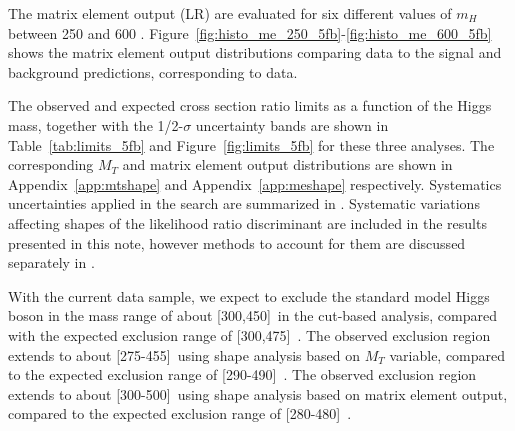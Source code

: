 The matrix element output (LR) are evaluated for six different values of $m_H$ between 250 and 600 \GeVcc.
Figure~\ref{fig:histo_me_250_5fb}-\ref{fig:histo_me_600_5fb} shows the matrix element output distributions 
comparing data to the signal and background predictions, corresponding to \intlumi data.

The observed and expected cross section ratio limits as a function of the Higgs mass, together with the 1/2-$\sigma$ uncertainty bands 
are shown in Table~\ref{tab:limits_5fb} and Figure~\ref{fig:limits_5fb} for these three analyses. 
The corresponding $M_T$ and matrix element output distributions are shown in Appendix~\ref{app:mtshape} and Appendix~\ref{app:meshape} respectively.
Systematics uncertainties applied in the search are summarized in \cite{ref:HZZ2011smurf}.
Systematic variations affecting shapes of the likelihood ratio discriminant are included in the results presented in this note,
however methods to account for them are discussed separately in \cite{ref:ShapeSmurf}. 


With the current data sample, we expect to exclude the standard model Higgs boson 
in the mass range of about [300,450]~\GeVcc in the cut-based analysis, compared with the 
expected exclusion range of [300,475]~\GeVcc. 
The observed exclusion region extends to about [275-455]~\GeVcc using shape analysis based on 
$M_T$ variable, compared to the expected exclusion range of [290-490]~\GeVcc.
The observed exclusion region extends to about [300-500]~\GeVcc using shape analysis based on 
matrix element output, compared to the expected exclusion range of [280-480]~\GeVcc.

